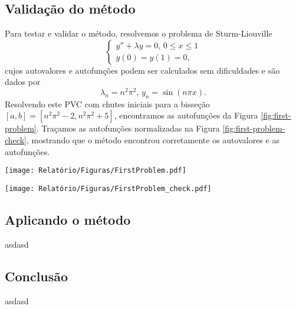 \documentclass[twocolumn,showpacs,%
  nofootinbib,aps,superscriptaddress,%
  eqsecnum,prd,notitlepage,showkeys,10pt]{revtex4-1}
\renewcommand{\leq}{\leqslant}
\begin{document}
\subsection{Validação do método}\label{subsec:validacao}
%
Para testar e validar o método, resolvemos o problema de Sturm-Liouville
%
\[
    \left\{
        \begin{array}{l}
            y'' + \lambda y = 0, \, 0 \leq x \leq 1 \\
            y(0) = y(1) = 0,
        \end{array}
    \right.
\]
%
cujos autovalores e autofunções podem ser calculados sem dificuldades e são dados por
%
\[
    \lambda_n = n^2\pi^2, \, y_n = \sin(n\pi x).
\]
%
Resolvendo este PVC com chutes iniciais para a bisseção $[a,b] = [n^2\pi^2 -2, n^2\pi^2 + 5]$, 
encontramos as autofunções da Figura \ref{fig:first-problem}.
Traçamos as autofunções normalizadas na Figura \ref{fig:first-problem-check}, mostrando
que o método encontrou corretamente os autovalores e as autofunções.
%
\begin{figure*}
    \centering
    \begin{minipage}[b]{.49\textwidth}
        \texttt{[image: Relatório/Figuras/FirstProblem.pdf]}
        \caption{Gráficos das primeiras cinco autofunções normalizadas
        encontradas numericamente.}\label{fig:first-problem}
    \end{minipage}\hfill
    \begin{minipage}[b]{.49\textwidth}
        \texttt{[image: Relatório/Figuras/FirstProblem\_check.pdf]}
        \caption{Gráficos das primeiras 5 autofunções normalizadas, $\sin(n\pi x)/(n\pi)$.}\label{fig:first-problem-check}
    \end{minipage}
\end{figure*}
%

%
\subsection{Aplicando o método}\label{subsec:aplicacao}
%

asdasd

%
\subsection{Conclusão}\label{subsec:conclusao}
%

asdasd

% 




% 


\end{document}
